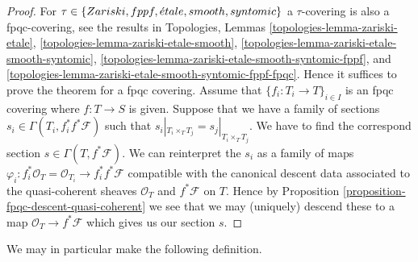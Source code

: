 \begin{proof}
For $\tau \in \{Zariski,\linebreak[0] fppf,\linebreak[0] \acute{e}tale,
\linebreak[0] smooth,\linebreak[0] syntomic\}$ a $\tau$-covering
is also a fpqc-covering, see the results in
Topologies, Lemmas
\ref{topologies-lemma-zariski-etale},
\ref{topologies-lemma-zariski-etale-smooth}, 
\ref{topologies-lemma-zariski-etale-smooth-syntomic},
\ref{topologies-lemma-zariski-etale-smooth-syntomic-fppf}, and
\ref{topologies-lemma-zariski-etale-smooth-syntomic-fppf-fpqc}.
Hence it suffices to prove the theorem
for a fpqc covering. Assume that $\{f_i : T_i \to T\}_{i \in I}$
is an fpqc covering where $f : T \to S$ is given. Suppose that
we have a family of sections $s_i \in \Gamma(T_i , f_i^*f^*\mathcal{F})$
such that $s_i|_{T_i \times_T T_j} = s_j|_{T_i \times_T T_j}$.
We have to find the correspond section $s \in \Gamma(T, f^*\mathcal{F})$.
We can reinterpret the $s_i$ as a family of maps
$\varphi_i : f_i^*\mathcal{O}_T = \mathcal{O}_{T_i} \to f_i^*f^*\mathcal{F}$
compatible with the canonical descent data associated to the
quasi-coherent sheaves $\mathcal{O}_T$ and $f^*\mathcal{F}$ on $T$.
Hence by Proposition \ref{proposition-fpqc-descent-quasi-coherent}
we see that we may (uniquely) descend
these to a map $\mathcal{O}_T \to f^*\mathcal{F}$ which gives
us our section $s$.
\end{proof}

\noindent
We may in particular make the following definition.


